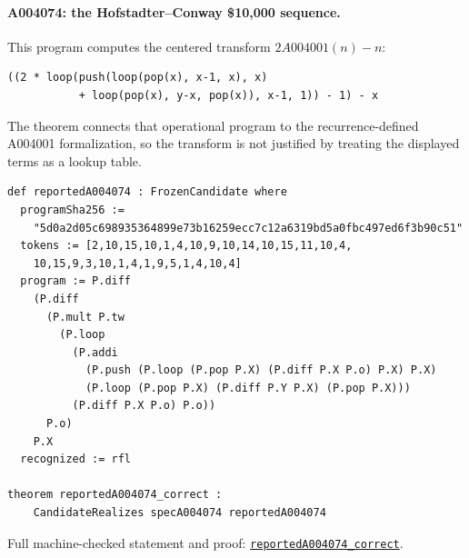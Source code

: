 \documentclass[11pt]{article}
\newcommand{\formalcommit}{f3a31db36bb2f944312ee31c1d86c2758109e83a}
\newcommand{\formalblob}{https://github.com/zariuq/MeTTapedia/blob/\formalcommit/lean/mettapedia/Mettapedia}
\newcommand{\leansource}[3]{%
  \href{\formalblob/#1\#L#2}{\nolinkurl{#3}}}
\begin{document}
\paragraph{A004074: the Hofstadter--Conway \$10,000 sequence.}
This program computes the centered transform $2A004001(n)-n$:
\begin{lstlisting}
((2 * loop(push(loop(pop(x), x-1, x), x)
           + loop(pop(x), y-x, pop(x)), x-1, 1)) - 1) - x
\end{lstlisting}
The theorem connects that operational program to the recurrence-defined A004001
formalization, so the transform is not justified by treating the displayed terms as a
lookup table.
\begin{lstlisting}[caption={The reported A004074 artifact and its universal Lean theorem.}]
def reportedA004074 : FrozenCandidate where
  programSha256 :=
    "5d0a2d05c698935364899e73b16259ecc7c12a6319bd5a0fbc497ed6f3b90c51"
  tokens := [2,10,15,10,1,4,10,9,10,14,10,15,11,10,4,
    10,15,9,3,10,1,4,1,9,5,1,4,10,4]
  program := P.diff
    (P.diff
      (P.mult P.tw
        (P.loop
          (P.addi
            (P.push (P.loop (P.pop P.X) (P.diff P.X P.o) P.X) P.X)
            (P.loop (P.pop P.X) (P.diff P.Y P.X) (P.pop P.X)))
          (P.diff P.X P.o) P.o))
      P.o)
    P.X
  recognized := rfl

theorem reportedA004074_correct :
    CandidateRealizes specA004074 reportedA004074
\end{lstlisting}
\noindent Full machine-checked statement and proof:
\leansource{GSLT/LanguageDef/Gauthier/ReportedSequencePrograms.lean}{388-L415}{reportedA004074_correct}.

\end{document}
